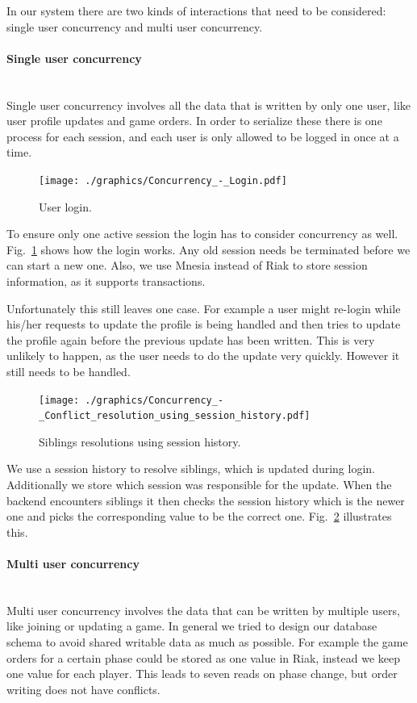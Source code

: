 \documentclass[11pt,a4paper]{report}
\newcommand{\subsubsubsection}[1]{\paragraph{#1}\mbox{}\\}
\begin{document}
In our system there are two kinds of interactions that need to be considered:
single user concurrency and multi user concurrency.

\subsubsubsection{Single user concurrency}
Single user concurrency involves all the data that is written by only one user,
like user profile updates and game orders.
In order to serialize these there is one process for each session,
and each user is only allowed to be logged in once at a time.
\begin{figure}[htbp!]
  \centering
 \texttt{[image: ./graphics/Concurrency\_-\_Login.pdf]}
 \vspace{-1cm}
 \caption{User login.}
 \label{fig:concurrency:login}
\end{figure}
To ensure only one active session the login has to consider concurrency as well.
Fig.~\ref{fig:concurrency:login} shows how the login works.
Any old session needs be terminated before we can start a new one.
Also, we use Mnesia instead of Riak to store session information,
as it supports transactions.

Unfortunately this still leaves one case.
For example a user might re-login while his/her requests to update the profile is
being handled and then tries to update the profile again before the previous
update has been written.
This is very unlikely to happen, as the user needs to do the update very
quickly.
However it still needs to be handled.
\begin{figure}[htbp!]
  \centering
 \texttt{[image: ./graphics/Concurrency\_-\_Conflict\_resolution\_using\_session\_history.pdf]}
 \vspace{-1cm}
 \caption{Siblings resolutions using session history.}
 \label{fig:concurrency:history}
\end{figure}
We use a session history to resolve siblings, which is updated during login.
Additionally we store which session was responsible for the update.
When the backend encounters siblings it then checks the session history which
is the newer one and picks the corresponding value to be the correct one.
Fig.~\ref{fig:concurrency:history} illustrates this.

\subsubsubsection{Multi user concurrency}
Multi user concurrency involves the data that can be written by multiple users,
like joining or updating a game.
In general we tried to  design our database schema to avoid shared writable data
as much as possible.
For example the game orders for a certain phase could be stored as one value in
Riak, instead we keep one value for each player.
This leads to seven reads on phase change, but order writing does not have
conflicts.
\end{document}
